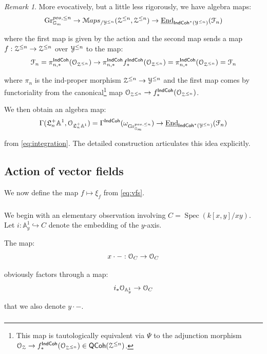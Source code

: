 \documentclass[reqno,11pt]{amsart}
\numberwithin{equation}{subsection}
\theoremstyle{remark}
\newtheorem{rem}[thm]{Remark}
\newcommand{\into}{\hookrightarrow}
\newcommand{\bA}{{\mathbb A}}
\newcommand{\bG}{{\mathbb G}}
\newcommand{\sF}{{\EuScript F}}
\newcommand{\sM}{{\EuScript M}}
\newcommand{\sO}{{\EuScript O}}
\newcommand{\sY}{{\EuScript Y}}
\newcommand{\sZ}{{\EuScript Z}}
\newcommand{\fL}{{\mathfrak L}}
\newcommand{\on}{\operatorname}
\newcommand{\ul}{\underline}
\newcommand{\End}{\on{End}}
\newcommand{\Spec}{\on{Spec}}
\newcommand{\Gr}{\on{Gr}}
\newcommand{\IndCoh}{\mathsf{IndCoh}}
\newcommand{\QCoh}{\mathsf{QCoh}}
\newcommand{\Maps}{\sM aps}
\begin{document}
\begin{rem}

More evocatively, but a little less rigorously, we have algebra maps:
%
\[
\Gr_{\bG_m}^{pos,\leq n} \to \Maps_{/\sY^{\leq n}}(\sZ^{\leq n},\sZ^{\leq n}) \to 
\ul{\End}_{\IndCoh^*(\sY^{\leq n})}(\sF_n)
\]

\noindent where the first map is given by the action and the second 
map sends a map $f:\sZ^{\leq n} \to \sZ^{\leq n}$ over $\sY^{\leq n}$ 
to the map: 
%
\[
\sF_n = \pi_{n,*}^{\IndCoh}(\sO_{\sZ^{\leq n}}) 
\to \pi_{n,*}^{\IndCoh}f_*^{\IndCoh}(\sO_{\sZ^{\leq n}}) = 
\pi_{n,*}^{\IndCoh}(\sO_{\sZ^{\leq n}}) = \sF_n
\]

\noindent where $\pi_n$ is the ind-proper morphism $\sZ^{\leq n} \to \sY^{\leq n}$ 
and the first map comes by functoriality from the canonical\footnote{This
map is tautologically equivalent via $\Psi$ to the adjunction morphism
$\sO_{\sZ} \to f_*^{\IndCoh}(\sO_{\sZ^{\leq n}}) \in \QCoh(\sZ^{\leq n})$.}
map $\sO_{\sZ^{\leq n}} \to f_*^{\IndCoh}(\sO_{\sZ^{\leq n}})$.

We then obtain an algebra map:
%
\[
\Gamma(\fL_n^+ \bA^1,\sO_{\fL_n^+ \bA^1}) =
\Gamma^{\IndCoh}(\omega_{\Gr_{\bG_m}^{pos,\leq n}}) \to 
\ul{\End}_{\IndCoh^*(\sY^{\leq n})}(\sF_n)
\]

\noindent from \eqref{eq:integration}. The detailed construction articulates
this idea explicitly.

\end{rem}

\subsection{Action of vector fields}

We now define the map $f \mapsto \xi_f$ from
\eqref{eq:vfs}.

\subsubsection{}

We begin with an elementary observation
involving $C = \Spec(k[x,y]/xy)$.
Let $i:\bA_y^1 \into C$ denote the 
embedding of the $y$-axis.

The map:
%
\[
x\cdot-:\sO_C \to \sO_C
\]

\noindent obviously factors through a map: 
%
\[
i_*\sO_{\bA_y^1} \to \sO_C
\]

\noindent that we also denote $y \cdot -$.

\subsubsection{}\label{ss:c-ind}
\end{document}
